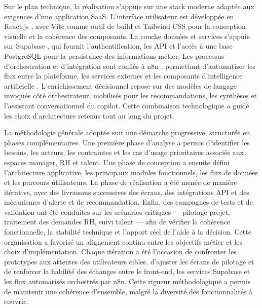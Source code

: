 Sur le plan technique, la réalisation s'appuie sur une stack moderne adaptée aux exigences d'une application SaaS. L'interface utilisateur est développée en React.js \cite{react2024}, avec Vite \cite{vite2025} comme outil de build et Tailwind CSS \cite{tailwind2025} pour la conception visuelle et la cohérence des composants. La couche données et services s'appuie sur Supabase \cite{supabase2025}, qui fournit l'authentification, les API et l'accès à une base PostgreSQL \cite{postgresql2025} pour la persistance des informations métier. Les processus d'orchestration et d'intégration sont confiés à n8n \cite{n8n2025}, permettant d'automatiser les flux entre la plateforme, les services externes et les composants d'intelligence artificielle \cite{openai2025,russell2021}. L'enrichissement décisionnel repose sur des modèles de langage invoqués côté orchestrateur, mobilisés pour les recommandations, les synthèses et l'assistant conversationnel du copilot. Cette combinaison technologique a guidé les choix d'architecture retenus tout au long du projet.

La méthodologie générale adoptée suit une démarche progressive, structurée en phases complémentaires. Une première phase d'analyse a permis d'identifier les besoins, les acteurs, les contraintes et les cas d'usage prioritaires associés aux espaces manager, RH et talent. Une phase de conception a ensuite défini l'architecture applicative, les principaux modules fonctionnels, les flux de données et les parcours utilisateurs. La phase de réalisation a été menée de manière itérative, avec des livraisons successives des écrans, des intégrations API et des mécanismes d'alerte et de recommandation. Enfin, des campagnes de tests et de validation ont été conduites sur les scénarios critiques --- pilotage projet, traitement des demandes RH, suivi talent --- afin de vérifier la cohérence fonctionnelle, la stabilité technique et l'apport réel de l'aide à la décision. Cette organisation a favorisé un alignement continu entre les objectifs métier et les choix d'implémentation. Chaque itération a été l'occasion de confronter les prototypes aux attentes des utilisateurs cibles, d'ajuster les écrans de pilotage et de renforcer la fiabilité des échanges entre le front-end, les services Supabase et les flux automatisés orchestrés par n8n. Cette rigueur méthodologique a permis de maintenir une cohérence d'ensemble, malgré la diversité des fonctionnalités à couvrir.

